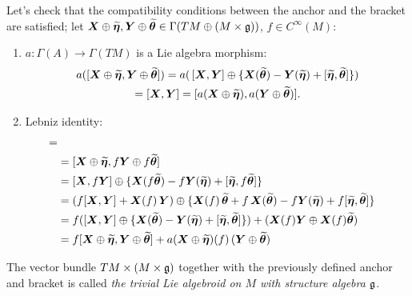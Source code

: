 Let's check that the compatibility conditions between the anchor and the bracket are satisfied; let $\bm{X} \oplus \widetilde{\bm{\eta}}, \bm{Y} \oplus \widetilde{\bm{\theta}} \in \Gamma(TM \oplus (M \times \mathfrak{g}))$, $f \in C^\infty(M)$:

    \begin{enumerate}
    \item $a: \Gamma(A) \to \Gamma(TM)$ is a Lie algebra morphism: 
    \begin{multline*}
    a([\bm{X} \oplus \widetilde{\bm{\eta}}, \bm{Y} \oplus \widetilde{\bm{\theta}}]) 
    = a(\, [\bm{X}, \bm{Y}] \oplus \{\bm{X}(\widetilde{\bm{\theta}}) - \bm{Y}(\widetilde{\bm{\eta}}) + [\widetilde{\bm{\eta}}, \widetilde{\bm{\theta}}]  \}) \\
    = [\bm{X}, \bm{Y}] 
    = [a(\bm{X} \oplus \widetilde{\bm{\eta}}), a(\bm{Y} \oplus \widetilde{\bm{\theta}})].    
    \end{multline*}
    
    
    \item Lebniz identity: 
    \begin{align*}
        [\sect X \oplus \stilde \eta, &f\, (\sect Y \oplus \stilde \theta)] =\\
        &= [\sect X \oplus \stilde \eta, f\sect Y \oplus f\stilde \theta] \\
        &=  [\sect X, f\sect Y] \oplus \{\sect X(f\stilde \theta) - f\sect Y(\stilde \eta) + [\stilde \eta, f\stilde \theta]\} \\
        &= (f[\sect X, \sect Y] + \sect X(f)\,\sect Y) \oplus \{\sect X(f)\,\stilde \theta + f\,\sect X(\stilde \theta) - f\sect Y(\stilde \eta) + f[\stilde \eta, \stilde \theta]\} \\
        &=f([\sect X, \sect Y] \oplus \{ \sect X(\stilde \theta) -\sect Y(\stilde \eta) + [\stilde \eta, \stilde \theta]\} ) + (\sect X(f) \sect Y \oplus \sect X(f)\stilde \theta) \\
        &= f[\sect X \oplus \stilde \eta, \sect Y \oplus \stilde \theta] + a(\sect X \oplus \stilde \eta)(f) \, (\sect Y \oplus \stilde \theta)
    \end{align*}
    \end{enumerate}

The vector bundle $TM \times (M \times \mathfrak{g})$ together with the previously defined anchor and bracket is called \emph{the trivial Lie algebroid on $M$ with structure algebra $\mathfrak{g}$}.






